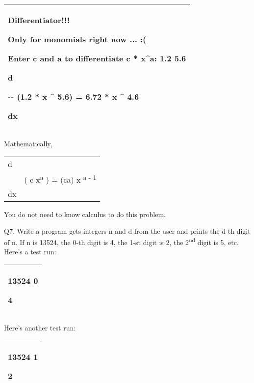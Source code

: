 \documentclass[
]{article}
\begin{document}
\begin{longtable}[]{@{}l@{}}
\toprule
\endhead
\begin{minipage}[t]{0.97\columnwidth}\raggedright
Differentiator!!!

Only for monomials right now ... :(

Enter c and a to differentiate c * x\^{}a: \textbf{1.2 5.6}

d

-\/- (1.2 * x \^{} 5.6) = 6.72 * x \^{} 4.6

dx\strut
\end{minipage}\tabularnewline
\bottomrule
\end{longtable}

Mathematically,

\begin{longtable}[]{@{}ll@{}}
\toprule
\endhead
d &\tabularnewline
& ( c x\textsuperscript{a }) = (ca) x \textsuperscript{a -
1}\tabularnewline
dx &\tabularnewline
\bottomrule
\end{longtable}

You do not need to know calculus to do this problem.

Q7. Write a program gets integers n and d from the user and prints the
d-th digit of n. If n is 13524, the 0-th digit is 4, the 1-st digit is
2, the 2\textsuperscript{nd} digit is 5, etc. Here's a test run:

\begin{longtable}[]{@{}l@{}}
\toprule
\endhead
\begin{minipage}[t]{0.97\columnwidth}\raggedright
13524 0

4\strut
\end{minipage}\tabularnewline
\bottomrule
\end{longtable}

Here's another test run:

\begin{longtable}[]{@{}l@{}}
\toprule
\endhead
\begin{minipage}[t]{0.97\columnwidth}\raggedright
13524 1

2\strut
\end{minipage}\tabularnewline
\bottomrule
\end{longtable}
\end{document}
